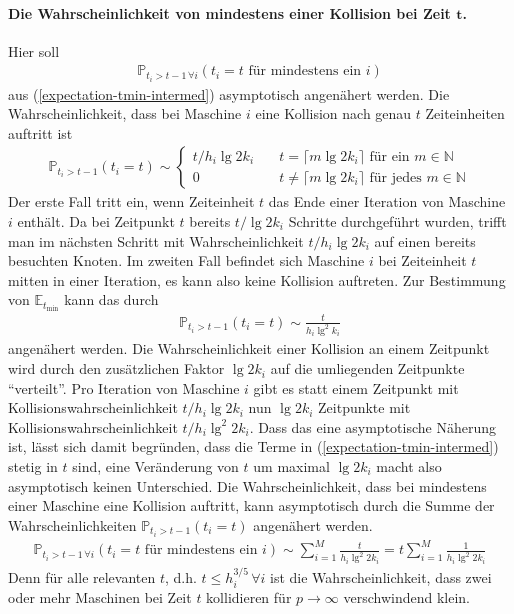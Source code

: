 \documentclass[a4paper, 10pt, ngerman]{article}
\newcommand{\E}{\mathbb{E}}
\newcommand{\N}{\mathbb{N}}
\renewcommand{\P}{\mathbb{P}}
\begin{document}
\paragraph{Die Wahrscheinlichkeit von mindestens einer Kollision bei Zeit $\pmb{t}$.} Hier soll
\begin{align*}
    \P_{t_i > t - 1 \, \forall i}(t_i = t \text{ für mindestens ein } i)
\end{align*}
aus (\ref{expectation-tmin-intermed}) asymptotisch angenähert werden. Die Wahrscheinlichkeit, dass bei Maschine $i$ eine Kollision nach genau $t$ Zeiteinheiten auftritt ist
\begin{align*}
    \P_{t_i > t - 1}(t_i = t) \sim
    \begin{cases}
        t / h_i \lg 2k_i & \quad
        t = \lceil m \lg 2k_i \rceil \text{ für ein } m \in \N \\
        0                & \quad
        t \ne \lceil m \lg 2k_i \rceil \text{ für jedes } m \in \N
    \end{cases}
\end{align*}
Der erste Fall tritt ein, wenn Zeiteinheit $t$ das Ende einer Iteration von Maschine $i$ enthält. Da bei Zeitpunkt $t$ bereits $t/\lg 2k_i$ Schritte durchgeführt wurden, trifft man im nächsten Schritt mit Wahrscheinlichkeit $t/h_i \lg 2k_i$ auf einen bereits besuchten Knoten. Im zweiten Fall befindet sich Maschine $i$ bei Zeiteinheit $t$ mitten in einer Iteration, es kann also keine Kollision auftreten. Zur Bestimmung von $\E_{t_{\min}}$ kann das durch
\begin{align*}
    \P_{t_i > t - 1}(t_i = t) \sim \frac {t} {h_i \lg^2 k_i}
\end{align*}
angenähert werden. Die Wahrscheinlichkeit einer Kollision an einem Zeitpunkt wird durch den zusätzlichen Faktor $\lg 2k_i$ auf die umliegenden Zeitpunkte "`verteilt"'. Pro Iteration von Maschine $i$ gibt es statt einem Zeitpunkt mit Kollisionswahrscheinlichkeit $t/h_i \lg 2k_i$ nun $\lg 2k_i$ Zeitpunkte mit Kollisionswahrscheinlichkeit $t/h_i \lg^2 2k_i$. Dass das eine asymptotische Näherung ist, lässt sich damit begründen, dass die Terme in (\ref{expectation-tmin-intermed}) stetig in $t$ sind, eine Veränderung von $t$ um maximal $\lg 2k_i$ macht also asymptotisch keinen Unterschied. Die Wahrscheinlichkeit, dass bei mindestens einer Maschine eine Kollision auftritt, kann asymptotisch durch die Summe der Wahrscheinlichkeiten $\P_{t_i > t - 1}(t_i = t)$ angenähert werden.
\begin{align}
    \P_{t_i > t - 1 \, \forall i}(t_i = t \text{ für mindestens ein } i)
    \sim \sum_{i = 1}^M \frac t {h_i \lg^2 2k_i}
    = t \sum_{i = 1}^M \frac 1 {h_i \lg^2 2k_i}
    \label{prob-at-least-one-coll}
\end{align}
Denn für alle relevanten $t$, d.h. $t \le h_i^{3/5} \, \forall i$ ist die Wahrscheinlichkeit, dass zwei oder mehr Maschinen bei Zeit $t$ kollidieren für $p \to \infty$ verschwindend klein.
\end{document}
